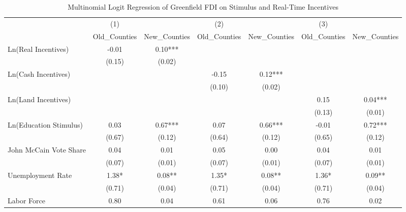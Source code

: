 \begin{table}[!htbp]\centering
\def\sym#1{\ifmmode^{#1}\else\(^{#1}\)\fi}
\caption{Multinomial Logit Regression of Greenfield FDI on Stimulus and Real-Time Incentives}
\begin{tabular}{l*{6}{c}}
\hline\hline
                    &         (1)   &               &         (2)   &               &         (3)   &               \\
                    &Old_Counties   &New_Counties   &Old_Counties   &New_Counties   &Old_Counties   &New_Counties   \\
\hline
Ln(Real Incentives) &       -0.01   &        0.10***&               &               &               &               \\
                    &      (0.15)   &      (0.02)   &               &               &               &               \\
Ln(Cash Incentives) &               &               &       -0.15   &        0.12***&               &               \\
                    &               &               &      (0.10)   &      (0.02)   &               &               \\
Ln(Land Incentives) &               &               &               &               &        0.15   &        0.04***\\
                    &               &               &               &               &      (0.13)   &      (0.01)   \\
Ln(Education Stimulus)&        0.03   &        0.67***&        0.07   &        0.66***&       -0.01   &        0.72***\\
                    &      (0.67)   &      (0.12)   &      (0.64)   &      (0.12)   &      (0.65)   &      (0.12)   \\
John McCain Vote Share&        0.04   &        0.01   &        0.05   &        0.00   &        0.04   &        0.01   \\
                    &      (0.07)   &      (0.01)   &      (0.07)   &      (0.01)   &      (0.07)   &      (0.01)   \\
Unemployment Rate   &        1.38*  &        0.08** &        1.35*  &        0.08** &        1.36*  &        0.09** \\
                    &      (0.71)   &      (0.04)   &      (0.71)   &      (0.04)   &      (0.71)   &      (0.04)   \\
Labor Force         &        0.80   &        0.04   &        0.61   &        0.06   &        0.76   &        0.02   \\

\end{tabular}
\end{table}
